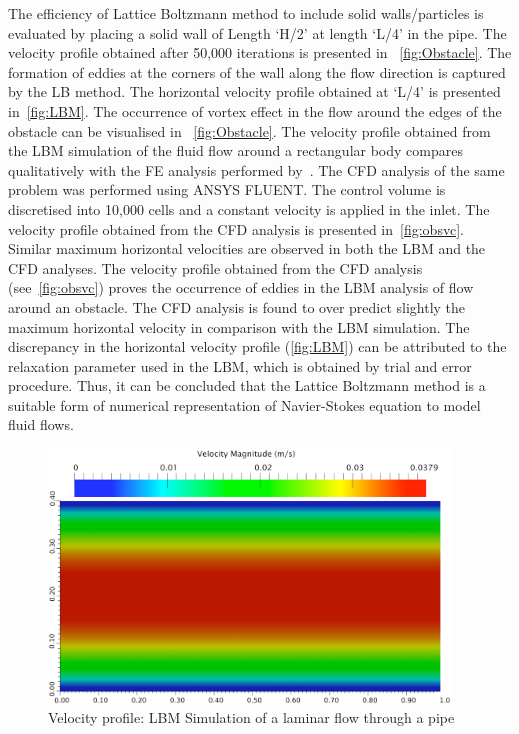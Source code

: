 The efficiency of Lattice Boltzmann method to include solid walls/particles is 
evaluated by placing a solid wall of Length `H/2' at length `L/4' in the pipe. 
The velocity profile obtained after 50,000 iterations is presented in 
~\cref{fig:Obstacle}. The formation of eddies at the corners of the wall along 
the flow direction is captured by the LB method. The horizontal velocity 
profile obtained at `L/4' is presented in~\cref{fig:LBM}. The occurrence of 
vortex effect in the flow around the edges of the obstacle can be visualised in 
~\cref{fig:Obstacle}. The velocity profile obtained from the LBM simulation of 
the fluid flow around a rectangular body compares qualitatively with the FE 
analysis performed by~\citet{Zhong1991}. The CFD analysis of the same problem 
was performed using ANSYS FLUENT. The control volume is discretised into 10,000 
cells and a constant velocity is applied in the inlet. The velocity profile 
obtained from the CFD analysis is presented in~\cref{fig:obsvc}. Similar 
maximum horizontal velocities are observed in both the LBM and the CFD 
analyses. The velocity profile obtained from the CFD analysis 
(see~\cref{fig:obsvc}) proves the occurrence of eddies in the LBM analysis of 
flow around an obstacle. The CFD analysis is found to over predict slightly the 
maximum horizontal velocity in comparison with the LBM simulation. The 
discrepancy in the horizontal velocity profile (\cref{fig:LBM}) can be 
attributed to the relaxation parameter used in the LBM, which is obtained by 
trial and error procedure. Thus, it can be concluded that the Lattice Boltzmann 
method is a suitable form of numerical representation of Navier-Stokes equation 
to model fluid flows. 

\begin{figure}[htbp]
\centering
\includegraphics[width=0.95\textwidth]{LBM_Poiseuille}
\caption{Velocity profile: LBM Simulation of a laminar flow through a pipe}
\label{fig:LBM_Poiseuille}
\end{figure}

